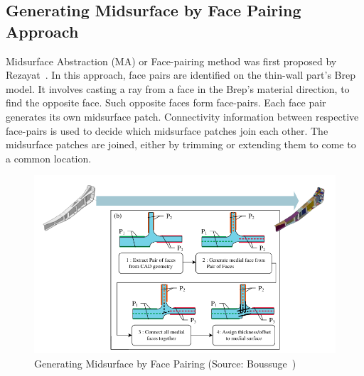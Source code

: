 
\subsection{Generating Midsurface by Face Pairing Approach}

Midsurface Abstraction (MA) or Face-pairing method was first proposed by Rezayat~\cite{Rezayat1996}. In this approach, face pairs are identified on the thin-wall part's Brep model. It involves casting a ray from a face in the Brep's material direction, to find the opposite face. Such opposite faces form face-pairs. Each face pair generates its own midsurface patch. Connectivity information between respective face-pairs is used to decide which midsurface patches join each other. The midsurface patches are joined, either by trimming or extending them to come to a common location.


	\begin{figure} [!h]
		\centering
		\includegraphics[width=\linewidth]{images/manual}
		\caption{Generating Midsurface by Face Pairing (Source: Boussuge~\cite{Boussuge2014})}
		\label{fig:litsurvey:manual}
	\end{figure}
	

